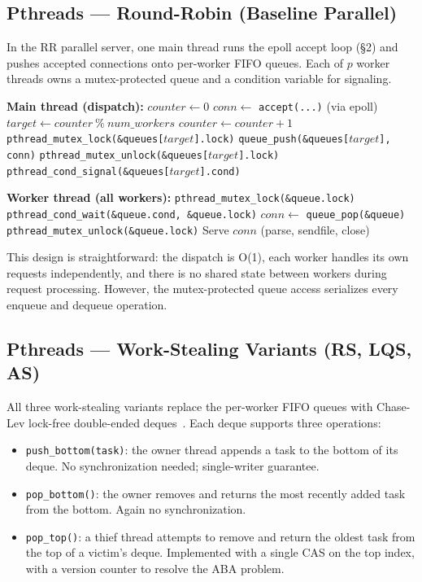 \documentclass[conference]{IEEEtran}
\begin{document}
\subsection{Pthreads --- Round-Robin (Baseline Parallel)}

In the RR parallel server, one main thread runs the epoll accept loop (\S2) and pushes accepted connections onto per-worker FIFO queues. Each of $p$ worker threads owns a mutex-protected queue and a condition variable for signaling.

\begin{algorithmic}
\STATE \textbf{Main thread (dispatch):}
\STATE $counter \gets 0$
\LOOP
    \STATE $conn \gets$ \texttt{accept(...)} (via epoll)
    \STATE $target \gets counter \ \%\ num\_workers$
    \STATE $counter \gets counter + 1$
    \STATE \texttt{pthread\_mutex\_lock(\&queues[$target$].lock)}
    \STATE \texttt{queue\_push(\&queues[$target$], conn)}
    \STATE \texttt{pthread\_mutex\_unlock(\&queues[$target$].lock)}
    \STATE \texttt{pthread\_cond\_signal(\&queues[$target$].cond)}
\ENDLOOP
\end{algorithmic}

\begin{algorithmic}
\STATE \textbf{Worker thread (all workers):}
\LOOP
    \STATE \texttt{pthread\_mutex\_lock(\&queue.lock)}
        \STATE \texttt{pthread\_cond\_wait(\&queue.cond, \&queue.lock)}
    \ENDWHILE
    \STATE $conn \gets$ \texttt{queue\_pop(\&queue)}
    \STATE \texttt{pthread\_mutex\_unlock(\&queue.lock)}
    \STATE Serve $conn$ (parse, sendfile, close)
\ENDLOOP
\end{algorithmic}

This design is straightforward: the dispatch is O(1), each worker handles its own requests independently, and there is no shared state between workers during request processing. However, the mutex-protected queue access serializes every enqueue and dequeue operation.

\subsection{Pthreads --- Work-Stealing Variants (RS, LQS, AS)}

All three work-stealing variants replace the per-worker FIFO queues with Chase-Lev lock-free double-ended deques~\cite{b3}. Each deque supports three operations:

\begin{itemize}
    \item \texttt{push\_bottom(task)}: the owner thread appends a task to the bottom of its deque. No synchronization needed; single-writer guarantee.
    \item \texttt{pop\_bottom()}: the owner removes and returns the most recently added task from the bottom. Again no synchronization.
    \item \texttt{pop\_top()}: a thief thread attempts to remove and return the oldest task from the top of a victim's deque. Implemented with a single CAS on the top index, with a version counter to resolve the ABA problem.
\end{itemize}
\end{document}
